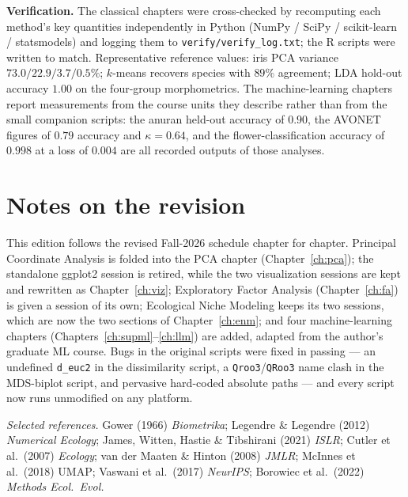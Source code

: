 \documentclass[11pt,oneside]{book}
\newcommand{\code}[1]{\texttt{#1}}
\newcommand{\R}{\textsf{R}}
\newcommand{\pkg}[1]{\textsf{#1}}
\begin{document}
\textbf{Verification.} The classical chapters were cross-checked by recomputing each
method's key quantities independently in Python (NumPy / SciPy / scikit-learn / statsmodels)
and logging them to \code{verify/verify\_log.txt}; the \R{} scripts were written to match.
Representative reference values: iris PCA variance $73.0/22.9/3.7/0.5\%$; $k$-means recovers
species with $89\%$ agreement; LDA hold-out accuracy $1.00$ on the four-group morphometrics.
The machine-learning chapters report measurements from the course units they describe rather
than from the small companion scripts: the anuran held-out accuracy of $0.90$, the AVONET
figures of $0.79$ accuracy and $\kappa=0.64$, and the flower-classification accuracy of
$0.998$ at a loss of $0.004$ are all recorded outputs of those analyses.

\chapter{Notes on the revision}
This edition follows the revised Fall-2026 schedule chapter for chapter. Principal
Coordinate Analysis is folded into the PCA chapter (Chapter~\ref{ch:pca}); the standalone
\pkg{ggplot2} session is retired, while the two visualization sessions are kept and
rewritten as Chapter~\ref{ch:viz}; Exploratory Factor Analysis (Chapter~\ref{ch:fa}) is
given a session of its own; Ecological Niche Modeling keeps its two sessions, which are
now the two sections of Chapter~\ref{ch:enm}; and four machine-learning chapters
(Chapters~\ref{ch:supml}--\ref{ch:llm}) are added, adapted from the author's graduate ML
course. Bugs in the original scripts were fixed in passing — an undefined
\code{d\_euc2} in the dissimilarity script, a \code{Qroo3}/\code{QRoo3} name clash in the
MDS-biplot script, and pervasive hard-coded absolute paths — and every script now runs
unmodified on any platform.

\vspace{1em}
{\small\itshape Selected references.} Gower (1966) \emph{Biometrika}; Legendre \&
Legendre (2012) \emph{Numerical Ecology}; James, Witten, Hastie \& Tibshirani (2021)
\emph{ISLR}; Cutler et al.\ (2007) \emph{Ecology}; van der Maaten \& Hinton (2008)
\emph{JMLR}; McInnes et al.\ (2018) UMAP; Vaswani et al.\ (2017) \emph{NeurIPS};
Borowiec et al.\ (2022) \emph{Methods Ecol.\ Evol.}



\end{document}
